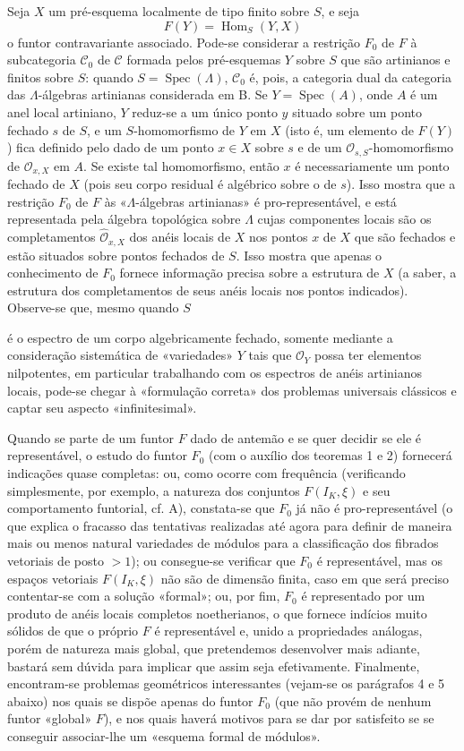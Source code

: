 Seja $X$ um pré-esquema localmente de tipo finito sobre $S$, e seja
\[
  F(Y)=\operatorname{Hom}_S(Y,X)
\]
o funtor contravariante associado. Pode-se considerar a restrição $F_0$ de
$F$ à subcategoria $\mathcal C_0$ de $\mathcal C$ formada pelos
pré-esquemas $Y$ sobre $S$ que são artinianos e finitos sobre $S$: quando
$S=\operatorname{Spec}(\Lambda)$, $\mathcal C_0$ é, pois, a categoria dual
da categoria das $\Lambda$-álgebras artinianas considerada em B. Se
$Y=\operatorname{Spec}(A)$, onde $A$ é um anel local artiniano, $Y$
reduz-se a um único ponto $y$ situado sobre um ponto fechado $s$ de $S$, e um
$S$-homomorfismo de $Y$ em $X$ (isto é, um elemento de $F(Y)$) fica definido
pelo dado de um ponto $x\in X$ sobre $s$ e de um
$\mathcal O_{s,S}$-homomorfismo de $\mathcal O_{x,X}$ em $A$. Se existe tal
homomorfismo, então $x$ é necessariamente um ponto fechado de $X$ (pois seu
corpo residual é algébrico sobre o de $s$). Isso mostra que a restrição
$F_0$ de $F$ às «$\Lambda$-álgebras artinianas» é pro-representável, e está
representada pela álgebra topológica sobre $\Lambda$ cujas componentes
locais são os completamentos $\widehat{\mathcal O}_{x,X}$ dos anéis locais
de $X$ nos pontos $x$ de $X$ que são fechados e estão situados sobre pontos
fechados de $S$. Isso mostra que apenas o conhecimento de $F_0$ fornece
informação precisa sobre a estrutura de $X$ (a saber, a estrutura dos
completamentos de seus anéis locais nos pontos indicados). Observe-se que,
mesmo quando $S$

é o espectro de um corpo algebricamente fechado, somente mediante a
consideração sistemática de «variedades» $Y$ tais que $\mathcal O_Y$ possa
ter elementos nilpotentes, em particular trabalhando com os espectros de
anéis artinianos locais, pode-se chegar à «formulação correta» dos
problemas universais clássicos e captar seu aspecto «infinitesimal».

Quando se parte de um funtor $F$ dado de antemão e se quer decidir se ele é
representável, o estudo do funtor $F_0$ (com o auxílio dos teoremas 1 e 2)
fornecerá indicações quase completas: ou, como ocorre com frequência
(verificando simplesmente, por exemplo, a natureza dos conjuntos
$F(I_K,\xi)$ e seu comportamento funtorial, cf. A), constata-se que $F_0$ já não
é pro-representável (o que explica o fracasso das tentativas realizadas
até agora para definir de maneira mais ou menos natural variedades de módulos
para a classificação dos fibrados vetoriais de posto $>1$); ou consegue-se
verificar que $F_0$ é representável, mas os espaços vetoriais
$F(I_K,\xi)$ não são de dimensão finita, caso em que será preciso contentar-se com
a solução «formal»; ou, por fim, $F_0$ é representado por um
produto de anéis locais completos noetherianos, o que fornece indícios muito
sólidos de que o próprio $F$ é representável e, unido a propriedades análogas,
porém de natureza mais global, que pretendemos desenvolver mais adiante, bastará
sem dúvida para implicar que assim seja efetivamente. Finalmente, encontram-se
problemas geométricos interessantes (vejam-se os parágrafos 4 e 5 abaixo) nos
quais se dispõe apenas do funtor $F_0$ (que não provém de nenhum funtor «global»
$F$), e nos quais haverá motivos para se dar por satisfeito se se conseguir associar-lhe
um «esquema formal de módulos».

